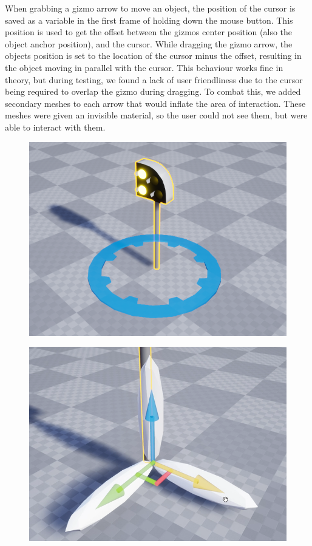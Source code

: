 When grabbing a gizmo arrow to move an object, the position of the cursor is saved as a variable in the first frame of holding down the mouse button. This position is used to get the offset between the gizmos center position (also the object anchor position), and the cursor. While dragging the gizmo arrow, the objects position is set to the location of the cursor minus the offset, resulting in the object moving in parallel with the cursor. This behaviour works fine in theory, but during testing, we found a lack of user friendliness due to the cursor being required to overlap the gizmo during dragging. To combat this, we added secondary meshes to each arrow that would inflate the area of interaction. These meshes were given an invisible material, so the user could not see them, but were able to interact with them.

\begin{figure}[h]
\centering
\begin{minipage}{.5\textwidth}
  \centering
  \includegraphics[width=0.95\linewidth]{figures/Gizmo3.png}
  \label{fig:test1}
\end{minipage}%
\begin{minipage}{.5\textwidth}
  \centering
  \includegraphics[width=0.95\linewidth]{figures/Gizmo4.png}
  \label{fig:test2}
\end{minipage}
\end{figure}

